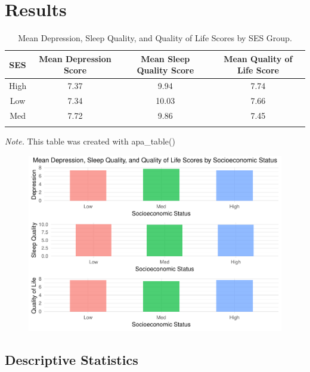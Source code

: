 \documentclass[man]{apa6}
\theoremstyle{definition}
\theoremstyle{definition}
\theoremstyle{definition}
\theoremstyle{remark}
\begin{document}
\section{Results}\label{results}

\begin{table}[tbp]
\begin{center}
\begin{threeparttable}
\caption{\label{tab:Table 1}Mean Depression, Sleep Quality, and Quality of Life Scores by SES Group.}
\begin{tabular}{cccc}
\toprule
SES & \multicolumn{1}{c}{Mean Depression Score} & \multicolumn{1}{c}{Mean Sleep Quality Score} & \multicolumn{1}{c}{Mean Quality of Life Score}\\
\midrule
High & 7.37 & 9.94 & 7.74\\
Low & 7.34 & 10.03 & 7.66\\
Med & 7.72 & 9.86 & 7.45\\
\bottomrule
\addlinespace
\end{tabular}
\begin{tablenotes}[para]
\normalsize{\textit{Note.} This table was created with apa\_table()}
\end{tablenotes}
\end{threeparttable}
\end{center}
\end{table}

\begin{figure}
\centering
\includegraphics{APA_Document_files/figure-latex/Plot 1-1.pdf}
\caption{}
\end{figure}

\subsection{Descriptive Statistics}\label{descriptive-statistics}
\end{document}
